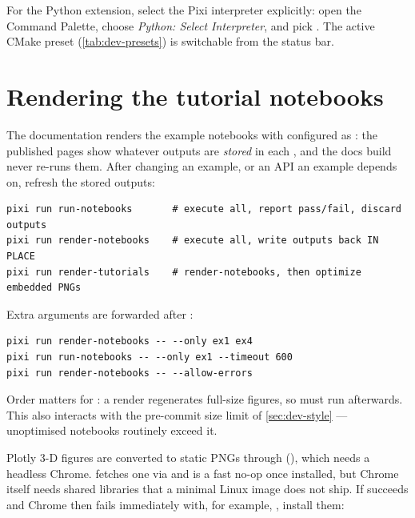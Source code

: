 For the Python extension, select the Pixi interpreter explicitly: open the
Command Palette, choose \emph{Python: Select Interpreter}, and pick
. The active CMake preset
(\cref{tab:dev-presets}) is switchable from the status bar.

\section{Rendering the tutorial notebooks}
\label{sec:dev-notebooks}

The documentation renders the example notebooks with 
configured as : the published pages show
whatever outputs are \emph{stored} in each , and the docs build
never re-runs them. After changing an example, or an API an example depends on,
refresh the stored outputs:

\begin{lstlisting}[language=shell]
pixi run run-notebooks       # execute all, report pass/fail, discard outputs
pixi run render-notebooks    # execute all, write outputs back IN PLACE
pixi run render-tutorials    # render-notebooks, then optimize embedded PNGs
\end{lstlisting}

Extra arguments are forwarded after \code{--}:

\begin{lstlisting}[language=shell]
pixi run render-notebooks -- --only ex1 ex4
pixi run run-notebooks -- --only ex1 --timeout 600
pixi run render-notebooks -- --allow-errors
\end{lstlisting}

Order matters for : a render regenerates full-size
figures, so  must run afterwards.
This also interacts with the pre-commit size limit of \cref{sec:dev-style} ---
unoptimised notebooks routinely exceed it.

Plotly 3-D figures are converted to static PNGs through 
(), which needs a headless Chrome.
 fetches one via  and is
a fast no-op once installed, but Chrome itself needs shared libraries that a
minimal Linux image does not ship. If  succeeds and
Chrome then fails immediately with, for example,
, install them:

